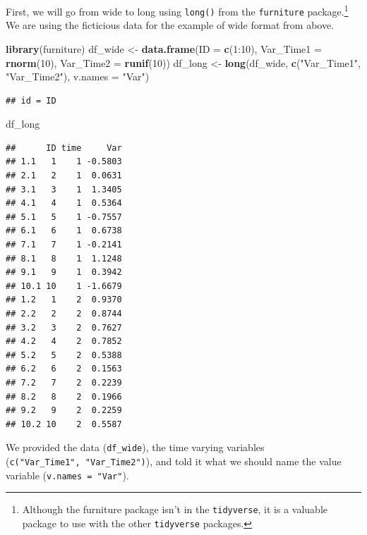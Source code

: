 \documentclass[]{tufte-book}
\newenvironment{Shaded}{}{}
\newcommand{\KeywordTok}[1]{\textcolor[rgb]{0.00,0.44,0.13}{\textbf{#1}}}
\newcommand{\DataTypeTok}[1]{\textcolor[rgb]{0.56,0.13,0.00}{#1}}
\newcommand{\DecValTok}[1]{\textcolor[rgb]{0.25,0.63,0.44}{#1}}
\newcommand{\StringTok}[1]{\textcolor[rgb]{0.25,0.44,0.63}{#1}}
\newcommand{\OperatorTok}[1]{\textcolor[rgb]{0.40,0.40,0.40}{#1}}
\newcommand{\NormalTok}[1]{#1}
\theoremstyle{definition}
\theoremstyle{definition}
\theoremstyle{remark}
\begin{document}
First, we will go from wide to long using \texttt{long()} from the
\texttt{furniture} package.\footnote{Although the furniture package
  isn't in the \texttt{tidyverse}, it is a valuable package to use with
  the other \texttt{tidyverse} packages.} We are using the ficticious
data for the example of wide format from above.

\begin{Shaded}
\begin{Highlighting}[]
\KeywordTok{library}\NormalTok{(furniture)}
\NormalTok{df_wide <-}\StringTok{ }\KeywordTok{data.frame}\NormalTok{(}\DataTypeTok{ID =} \KeywordTok{c}\NormalTok{(}\DecValTok{1}\OperatorTok{:}\DecValTok{10}\NormalTok{), }\DataTypeTok{Var_Time1 =} \KeywordTok{rnorm}\NormalTok{(}\DecValTok{10}\NormalTok{), }
    \DataTypeTok{Var_Time2 =} \KeywordTok{runif}\NormalTok{(}\DecValTok{10}\NormalTok{))}
\NormalTok{df_long <-}\StringTok{ }\KeywordTok{long}\NormalTok{(df_wide, }\KeywordTok{c}\NormalTok{(}\StringTok{"Var_Time1"}\NormalTok{, }\StringTok{"Var_Time2"}\NormalTok{), }
    \DataTypeTok{v.names =} \StringTok{"Var"}\NormalTok{)}
\end{Highlighting}
\end{Shaded}

\begin{verbatim}
## id = ID
\end{verbatim}

\begin{Shaded}
\begin{Highlighting}[]
\NormalTok{df_long}
\end{Highlighting}
\end{Shaded}

\begin{verbatim}
##      ID time     Var
## 1.1   1    1 -0.5803
## 2.1   2    1  0.0631
## 3.1   3    1  1.3405
## 4.1   4    1  0.5364
## 5.1   5    1 -0.7557
## 6.1   6    1  0.6738
## 7.1   7    1 -0.2141
## 8.1   8    1  1.1248
## 9.1   9    1  0.3942
## 10.1 10    1 -1.6679
## 1.2   1    2  0.9370
## 2.2   2    2  0.8744
## 3.2   3    2  0.7627
## 4.2   4    2  0.7852
## 5.2   5    2  0.5388
## 6.2   6    2  0.1563
## 7.2   7    2  0.2239
## 8.2   8    2  0.1966
## 9.2   9    2  0.2259
## 10.2 10    2  0.5587
\end{verbatim}

We provided the data (\texttt{df\_wide}), the time varying variables
(\texttt{c("Var\_Time1",\ "Var\_Time2")}), and told it what we should
name the value variable (\texttt{v.names\ =\ "Var"}).
\end{document}
